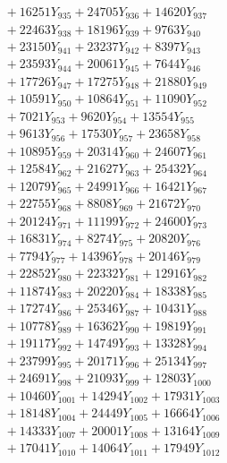 \documentclass[a4paper,10pt]{article}
\begin{document}
{\begin{align}
&\;  + 16251 Y_{935} + 24705 Y_{936} + 14620 Y_{937} \\[0.3ex]
&\;  + 22463 Y_{938} + 18196 Y_{939} + 9763 Y_{940} \\[0.3ex]
&\;  + 23150 Y_{941} + 23237 Y_{942} + 8397 Y_{943} \\[0.3ex]
&\;  + 23593 Y_{944} + 20061 Y_{945} + 7644 Y_{946} \\[0.3ex]
&\;  + 17726 Y_{947} + 17275 Y_{948} + 21880 Y_{949} \\[0.3ex]
&\;  + 10591 Y_{950} + 10864 Y_{951} + 11090 Y_{952} \\[0.3ex]
&\;  + 7021 Y_{953} + 9620 Y_{954} + 13554 Y_{955} \\[0.3ex]
&\;  + 9613 Y_{956} + 17530 Y_{957} + 23658 Y_{958} \\[0.5ex]\allowbreak
&\;  + 10895 Y_{959} + 20314 Y_{960} + 24607 Y_{961} \\[0.3ex]
&\;  + 12584 Y_{962} + 21627 Y_{963} + 25432 Y_{964} \\[0.3ex]
&\;  + 12079 Y_{965} + 24991 Y_{966} + 16421 Y_{967} \\[0.3ex]
&\;  + 22755 Y_{968} + 8808 Y_{969} + 21672 Y_{970} \\[0.3ex]
&\;  + 20124 Y_{971} + 11199 Y_{972} + 24600 Y_{973} \\[0.3ex]
&\;  + 16831 Y_{974} + 8274 Y_{975} + 20820 Y_{976} \\[0.3ex]
&\;  + 7794 Y_{977} + 14396 Y_{978} + 20146 Y_{979} \\[0.3ex]
&\;  + 22852 Y_{980} + 22332 Y_{981} + 12916 Y_{982} \\[0.3ex]
&\;  + 11874 Y_{983} + 20220 Y_{984} + 18338 Y_{985} \\[0.3ex]
&\;  + 17274 Y_{986} + 25346 Y_{987} + 10431 Y_{988} \\[0.5ex]\allowbreak
&\;  + 10778 Y_{989} + 16362 Y_{990} + 19819 Y_{991} \\[0.3ex]
&\;  + 19117 Y_{992} + 14749 Y_{993} + 13328 Y_{994} \\[0.3ex]
&\;  + 23799 Y_{995} + 20171 Y_{996} + 25134 Y_{997} \\[0.3ex]
&\;  + 24691 Y_{998} + 21093 Y_{999} + 12803 Y_{1000} \\[0.3ex]
&\;  + 10460 Y_{1001} + 14294 Y_{1002} + 17931 Y_{1003} \\[0.3ex]
&\;  + 18148 Y_{1004} + 24449 Y_{1005} + 16664 Y_{1006} \\[0.3ex]
&\;  + 14333 Y_{1007} + 20001 Y_{1008} + 13164 Y_{1009} \\[0.3ex]
&\;  + 17041 Y_{1010} + 14064 Y_{1011} + 17949 Y_{1012} \\[0.3ex]

\end{align}}
\end{document}
